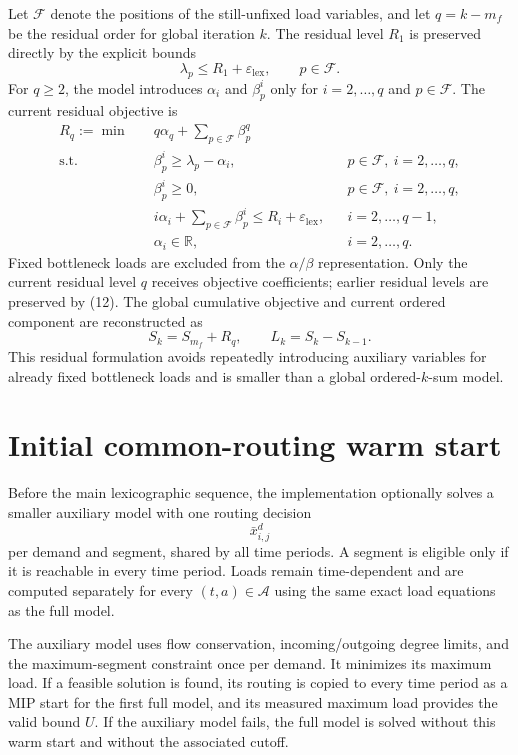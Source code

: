 \documentclass[11pt,a4paper]{article}
\newcommand{\R}{\mathbb{R}}
\newcommand{\Acal}{\mathcal{A}}
\newcommand{\Fcal}{\mathcal{F}}
\begin{document}
Let $\Fcal$ denote the positions of the still-unfixed load variables, and let
$q=k-m_f$ be the residual order for global iteration $k$. The residual level
$R_1$ is preserved directly by the explicit bounds
\[
\lambda_p\leq R_1+\varepsilon_{\mathrm{lex}},
\qquad p\in\Fcal.
\]
For $q\geq2$, the model introduces $\alpha_i$ and $\beta_p^i$ only for
$i=2,\ldots,q$ and $p\in\Fcal$. The current residual objective is
\begin{align}
R_q:=\min\quad
&q\alpha_q+\sum_{p\in\Fcal}\beta_p^q \tag{9}\\
\text{s.t.}\quad
&\beta_p^i\geq\lambda_p-\alpha_i,
&&p\in\Fcal,\ i=2,\ldots,q, \tag{10}\\
&\beta_p^i\geq0,
&&p\in\Fcal,\ i=2,\ldots,q, \tag{11}\\
&i\alpha_i+\sum_{p\in\Fcal}\beta_p^i
\leq R_i+\varepsilon_{\mathrm{lex}},
&&i=2,\ldots,q-1, \tag{12}\\
&\alpha_i\in\R,
&&i=2,\ldots,q. \tag{13}
\end{align}
Fixed bottleneck loads are excluded from the $\alpha/\beta$ representation. Only
the current residual level $q$ receives objective coefficients; earlier residual
levels are preserved by (12). The global cumulative objective and current ordered
component are reconstructed as
\[
S_k=S_{m_f}+R_q,
\qquad
L_k=S_k-S_{k-1}.
\]
This residual formulation avoids repeatedly introducing auxiliary variables for
already fixed bottleneck loads and is smaller than a global ordered-$k$-sum model.

\section{Initial common-routing warm start}

Before the main lexicographic sequence, the implementation optionally solves a
smaller auxiliary model with one routing decision
\[
\bar{x}_{i,j}^{d}
\]
per demand and segment, shared by all time periods. A segment is eligible only
if it is reachable in every time period. Loads remain time-dependent and are
computed separately for every $(t,a)\in\Acal$ using the same exact load equations
as the full model.

The auxiliary model uses flow conservation, incoming/outgoing degree limits,
and the maximum-segment constraint once per demand. It minimizes its maximum
load. If a feasible solution is found, its routing is copied to every time
period as a MIP start for the first full model, and its measured maximum load
provides the valid bound $U$. If the auxiliary model fails, the full model is
solved without this warm start and without the associated cutoff.
\end{document}
